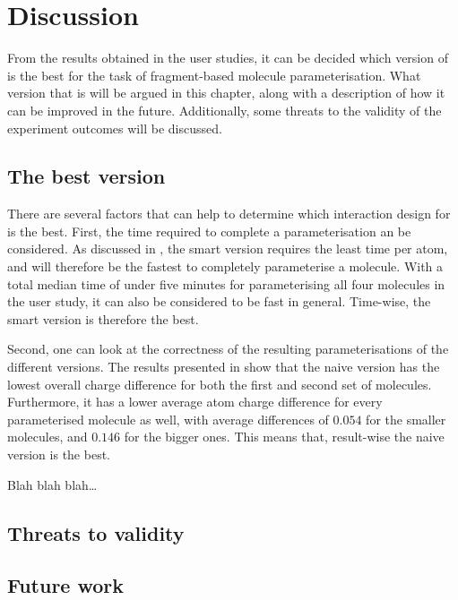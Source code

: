 \chapter{Discussion}

From the results obtained in the user studies, it can be decided which version of \oframp{} is the best for the task of fragment-based molecule parameterisation. What version that is will be argued in this chapter, along with a description of how it can be improved in the future. Additionally, some threats to the validity of the experiment outcomes will be discussed.


\section{The best version}
There are several factors that can help to determine which interaction design for \oframp{} is the best. First, the time required to complete a parameterisation an be considered. As discussed in , the smart version requires the least time per atom, and will therefore be the fastest to completely parameterise a molecule. With a total median time of under five minutes for parameterising all four molecules in the user study, it can also be considered to be fast in general. Time-wise, the smart version is therefore the best.

Second, one can look at the correctness of the resulting parameterisations of the different versions. The results presented in  show that the naive version has the lowest overall charge difference for both the first and second set of molecules. Furthermore, it has a lower average atom charge difference for every parameterised molecule as well, with average differences of $0.054$ for the smaller molecules, and $0.146$ for the bigger ones. This means that, result-wise the naive version is the best.

Blah blah blah\ldots


\section{Threats to validity}
\nlipsum


\section{Future work}
\nlipsum
